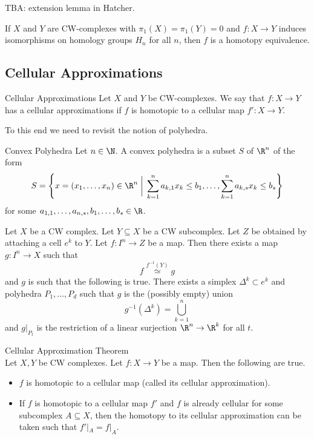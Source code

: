 \documentclass[a4paper]{article}
\begin{document}
TBA: extension lemma in Hatcher. 

\begin{crl}{}{} If $X$ and $Y$ are CW-complexes with $\pi_1(X)=\pi_1(Y)=0$ and $f:X\to Y$ induces isomorphisms on homology groups $H_n$ for all $n$, then $f$ is a homotopy equivalence. 
\end{crl}

\subsection{Cellular Approximations}
\begin{defn}{Cellular Approximations}{} Let $X$ and $Y$ be CW-complexes. We say that $f:X\to Y$ has a cellular approximations if $f$ is homotopic to a cellular map $f':X\to Y$. 
\end{defn}

To this end we need to revisit the notion of polyhedra. 

\begin{defn}{Convex Polyhedra}{} Let $n\in\N$. A convex polyhedra is a subset $S$ of $\R^n$ of the form $$S=\left\{x=(x_1,\dots,x_n)\in\R^n\;\bigg{|}\;\sum_{k=1}^na_{k,1}x_k\leq b_1,\dots,\sum_{k=1}^n a_{k,s}x_k\leq b_s\right\}$$ for some $a_{1,1},\dots,a_{n,s},b_1,\dots,b_s\in\R$. 
\end{defn}

\begin{lmm}{}{} Let $X$ be a CW complex. Let $Y\subseteq X$ be a CW subcomplex. Let $Z$ be obtained by attaching a cell $e^k$ to $Y$. Let $f:I^n\to Z$ be a map. Then there exists a map $g:I^n\to X$ such that $$f\overset{f^{-1}(Y)}{\simeq} g$$ and $g$ is such that the following is true. There exists a simplex $\Delta^k\subset e^k$ and polyhedra $P_1,\dots,P_d$ such that $g$ is the (possibly empty) union $$g^{-1}(\Delta^k)=\bigcup_{k=1}^n$$ and $g|_{P_t}$ is the restriction of a linear surjection $\R^n\to\R^k$ for all $t$. 
\end{lmm}

\begin{thm}{Cellular Approximation Theorem}{}\\
Let $X,Y$ be CW complexes. Let $f:X\to Y$ be a map. Then the following are true. 
\begin{itemize}
\item $f$ is homotopic to a cellular map (called its cellular approximation). 
\item If $f$ is homotopic to a cellular map $f'$ and $f$ is already cellular for some subcomplex $A\subseteq X$, then the homotopy to its cellular approximation can be taken such that $f'|_A=f|_A$. 
\end{itemize}
\end{thm}
\end{document}
